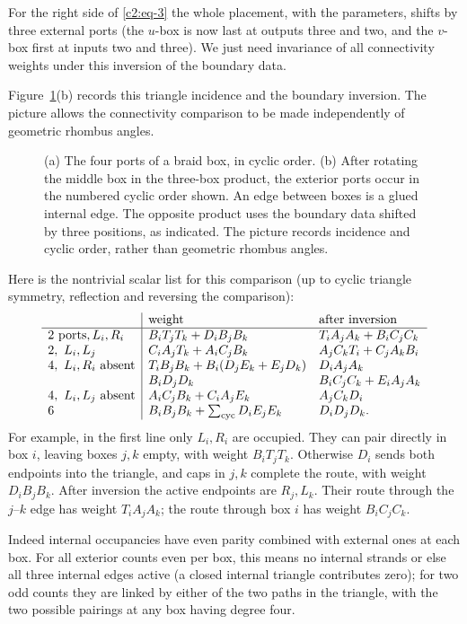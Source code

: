 For the right side of \eqref{c2:eq-3} the whole placement, with the parameters, shifts by three external ports (the \(u\)-box is now last at outputs three and two, and the \(v\)-box first at inputs two and three). We just need invariance of all connectivity weights under this inversion of the boundary data.

Figure~\ref{fig:box-order}(b) records this triangle incidence and the
boundary inversion.  The picture allows the connectivity comparison to
be made independently of geometric rhombus angles.
\begin{figure}[htbp]
\centering

\caption{(a) The four ports of a braid box, in cyclic order.
(b) After rotating the middle box in the three-box product, the exterior
ports occur in the numbered cyclic order shown.  An edge between boxes
is a glued internal edge.  The opposite product uses the boundary data
shifted by three positions, as indicated.  The picture records incidence
and cyclic order, rather than geometric rhombus angles.}
\label{fig:box-order}
\end{figure}

Here is the nontrivial scalar list for this comparison (up to cyclic triangle symmetry, reflection and reversing the comparison):
\[
\begin{array}{l|ll}
 &\text{weight}&\text{after inversion}\\\hline
 2\text{ ports}, L_i,R_i
     &B_iT_jT_k+D_iB_jB_k&T_i A_j A_k+B_i C_j C_k\\
 2,\ L_i,L_j
     &C_i A_j T_k+A_i C_j B_k&A_j C_k T_i+C_j A_k B_i\\
 4,\ L_i,R_i\text{ absent}
     &T_i B_jB_k+B_i(D_jE_k+E_jD_k)& D_i A_j A_k\\
     &B_i D_jD_k & B_i C_j C_k+E_i A_j A_k\\
 4,\ L_i,L_j\text{ absent}
     & A_i C_j B_k+C_i A_j E_k & A_j C_k D_i\\
 6   &B_iB_jB_k+\sum_{\rm cyc} D_i E_j E_k &D_iD_jD_k .
\end{array}
\]
For example, in the first line only $L_i,R_i$ are occupied.
They can pair directly in box $i$, leaving boxes $j,k$ empty, with weight
$B_iT_jT_k$.  Otherwise $D_i$ sends both endpoints into the triangle,
and caps in $j,k$ complete the route, with weight $D_iB_jB_k$.
After inversion the active endpoints are $R_j,L_k$.  Their route through
the $j$--$k$ edge has weight $T_iA_jA_k$; the route through box $i$
has weight $B_iC_jC_k$.

Indeed internal occupancies have even parity combined with external ones at each box. For all exterior counts even per box, this means no internal strands or else all three internal edges active (a closed internal triangle contributes zero); for two odd counts they are linked by either of the two paths in the triangle, with the two possible pairings at any box having degree four. 

